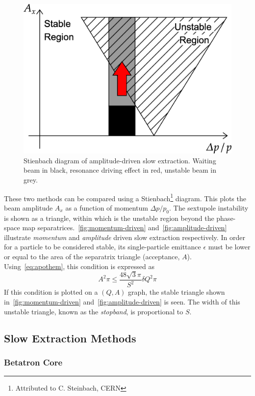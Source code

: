 \documentclass[11pt]{report}
\begin{document}
\begin{figure}[ht]
  \centering
  \includegraphics[width=0.6\linewidth]{amplitude-driven.png}
  \caption{Stienbach diagram of amplitude-driven slow extraction. Waiting beam in black, resonance driving effect in red, unstable beam in grey.}\label{fig:amplitude-driven}
\end{figure}

These two methods can be compared using a Stienbach\footnote{Attributed to C. Steinbach, CERN} diagram. This plots the beam amplitude $A_x$ as a function of momentum $\Delta p/p_0$. The sextupole instability is shown as a triangle, within which is the unstable region beyond the phase-space map separatrices.~\autoref{fig:momentum-driven} and~\autoref{fig:amplitude-driven} illustrate \textit{momentum} and \textit{amplitude} driven slow extraction respectively.
In order for a particle to be considered stable, its single-particle emittance $\epsilon$ must be lower or equal to the area of the separatrix triangle (acceptance, $A$). Using~\autoref{eq:apothem}, this condition is expressed as
\begin{equation}
  A^2\pi\le\frac{48\sqrt 3\pi}{S^2}\delta Q^2\pi
\end{equation} 
If this condition is plotted on a $(Q, A)$ graph, the stable triangle shown in~\autoref{fig:momentum-driven} and~\autoref{fig:amplitude-driven} is seen. The width of this unstable triangle, known as the \textit{stopband}, is proportional to $S$.


\subsection{Slow Extraction Methods}

\subsubsection{Betatron Core}
\end{document}
